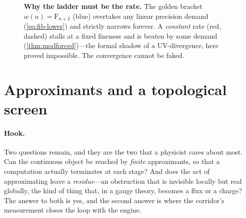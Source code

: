 \documentclass[11pt,letterpaper]{article}
\theoremstyle{plain}
\theoremstyle{definition}
\theoremstyle{remark}
\newcommand{\fib}{\mathrm{F}}                           %
\begin{document}
\begin{figure}[t]
\centering
{}
\caption{\textbf{Why the ladder must be the rate.} The golden bracket
$w(n)=\fib_{n+2}$ (blue) overtakes any linear precision demand
(\cref{eq:fib-lower}) and strictly narrows forever. A \emph{constant} rate (red,
dashed) stalls at a fixed fineness and is beaten by some demand
(\cref{thm:modforced})---the formal shadow of a UV-divergence, here proved
impossible. The convergence cannot be faked.}
\label{fig:ladder}
\end{figure}

\section{Approximants and a topological screen}\label{sec:screen}

\paragraph{Hook.}
Two questions remain, and they are the two that a physicist
cares about most. Can the continuous object be reached by \emph{finite}
approximants, so that a computation actually terminates at each stage? And does
the act of approximating leave a \emph{residue}---an obstruction that is invisible
locally but real globally, the kind of thing that, in a gauge theory, becomes a
flux or a charge? The answer to both is yes, and the second answer is where the
corridor's measurement closes the loop with the engine.
\end{document}
